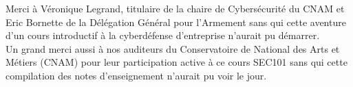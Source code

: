 

\newpage

\thispagestyle{empty}

\begin{center}

\Large{Merci à Véronique Legrand, titulaire de la chaire de Cybersécurité du CNAM et  Eric Bornette de la Délégation Général pour l'Armement sans qui cette aventure d'un cours introductif à la cyberdéfense d'entreprise n'aurait pu démarrer. 
\\ 


Un grand merci aussi à nos auditeurs du Conservatoire de National des Arts et Métiers (CNAM) pour leur participation active à ce cours SEC101 sans qui cette compilation des notes d'enseignement n'aurait pu voir le jour. 
}

\end{center}

\clearpage 


